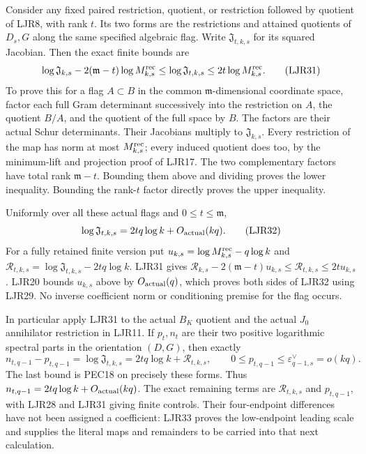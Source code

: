 \documentclass[11pt,a4paper]{article}
\begin{document}
Consider any fixed paired restriction, quotient, or
restriction followed by quotient of LJR8, with rank $t$.
Its two forms are the restrictions and attained quotients
of $D_s,G$ along the same specified algebraic flag.
Write $\mathfrak J_{t,k,s}$ for its squared Jacobian.
Then the exact finite bounds are
\[
 \log\mathfrak J_{k,s}
       -2(\mathfrak m-t)\log M_{k,s}^{\rm rec}
 \le\log\mathfrak J_{t,k,s}
 \le2t\log M_{k,s}^{\rm rec}.
 \tag{LJR31}
\]
To prove this for a flag $A\subset B$ in the common
$\mathfrak m$-dimensional coordinate space, factor each
full Gram determinant successively into the restriction
on $A$, the quotient $B/A$, and the quotient of the full
space by $B$. The factors are their actual Schur
determinants. Their Jacobians multiply to
$\mathfrak J_{k,s}$.
Every restriction of the map has norm at most $M_{k,s}^{\rm rec}$;
every induced quotient does too, by the minimum-lift and
projection proof of LJR17. The two complementary factors
have total rank $\mathfrak m-t$. Bounding them above and
dividing proves the lower inequality. Bounding the rank-$t$
factor directly proves the upper inequality.

Uniformly over all these actual flags and $0\le t\le\mathfrak m$,
\[
 \log\mathfrak J_{t,k,s}
       =2tq\log k+O_{\rm actual}(kq).
 \tag{LJR32}
\]
For a fully retained finite version put
$u_{k,s}=\log M_{k,s}^{\rm rec}-q\log k$ and
$\mathscr R_{t,k,s}=\log\mathfrak J_{t,k,s}-2tq\log k$.
LJR31 gives
$\mathscr R_{k,s}-2(\mathfrak m-t)u_{k,s}
 \le\mathscr R_{t,k,s}\le2t u_{k,s}$.
LJR20 bounds $u_{k,s}$ above by $O_{\rm actual}(q)$,
which proves both sides of LJR32 using LJR29.
No inverse coefficient norm or conditioning premise for
the flag occurs.

In particular apply LJR31 to the actual $B_K$ quotient and
the actual $J_0$ annihilator restriction in LJR11. If $p_t,n_t$
are their two positive logarithmic spectral parts in the
orientation $(D,G)$, then exactly
\[
 n_{t,q-1}-p_{t,q-1}
 =\log\mathfrak J_{t,k,s}
 =2tq\log k+\mathscr R_{t,k,s},\qquad
 0\le p_{t,q-1}\le\varepsilon^\vee_{q-1,s}=o(kq).
 \tag{LJR33}
\]
The last bound is PEC18 on precisely these forms. Thus
$n_{t,q-1}=2tq\log k+O_{\rm actual}(kq)$.
The exact remaining terms are $\mathscr R_{t,k,s}$ and
$p_{t,q-1}$, with LJR28 and LJR31 giving finite controls.
Their four-endpoint differences have not been assigned
a coefficient: LJR33 proves the low-endpoint leading scale
and supplies the literal maps and remainders to be carried
into that next calculation.

\end{document}
